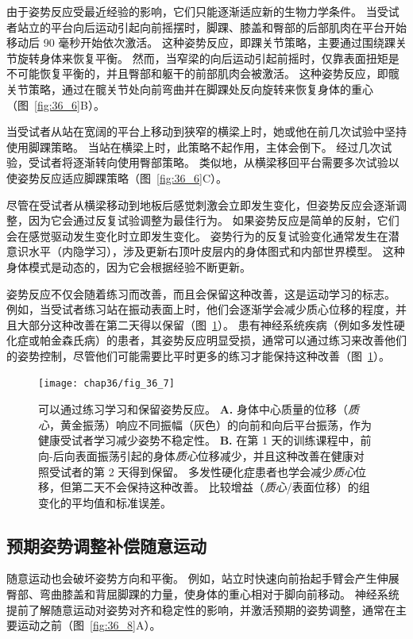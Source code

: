 由于姿势反应受最近经验的影响，它们只能逐渐适应新的生物力学条件。
当受试者站立的平台向后运动引起向前摇摆时，脚踝、膝盖和臀部的后部肌肉在平台开始移动后 90 毫秒开始依次激活。
这种姿势反应，即踝关节策略，主要通过围绕踝关节旋转身体来恢复平衡。
然而，当窄梁的向后运动引起前摇时，仅靠表面扭矩是不可能恢复平衡的，并且臀部和躯干的前部肌肉会被激活。
这种姿势反应，即髋关节策略，通过在髋关节处向前弯曲并在脚踝处反向旋转来恢复身体的重心（图~\ref{fig:36_6}B）。


当受试者从站在宽阔的平台上移动到狭窄的横梁上时，她或他在前几次试验中坚持使用脚踝策略。
当站在横梁上时，此策略不起作用，主体会倒下。
经过几次试验，受试者将逐渐转向使用臀部策略。
类似地，从横梁移回平台需要多次试验以使姿势反应适应脚踝策略（图~\ref{fig:36_6}C）。


尽管在受试者从横梁移动到地板后感觉刺激会立即发生变化，但姿势反应会逐渐调整，因为它会通过反复试验调整为最佳行为。
如果姿势反应是简单的反射，它们会在感觉驱动发生变化时立即发生变化。
姿势行为的反复试验变化通常发生在潜意识水平（内隐学习），涉及更新右顶叶皮层内的身体图式和内部世界模型。
这种身体模式是动态的，因为它会根据经验不断更新。


姿势反应不仅会随着练习而改善，而且会保留这种改善，这是运动学习的标志。
例如，当受试者练习站在振动表面上时，他们会逐渐学会减少质心位移的程度，并且大部分这种改善在第二天得以保留（图~\ref{fig:36_7}）。
患有神经系统疾病（例如多发性硬化症或帕金森氏病）的患者，其姿势反应明显受损，通常可以通过练习来改善他们的姿势控制，尽管他们可能需要比平时更多的练习才能保持这种改善（图~\ref{fig:36_7}）。


\begin{figure}[htbp]
	\centering
	\texttt{[image: chap36/fig\_36\_7]}
	\caption{可以通过练习学习和保留姿势反应。
		\textbf{A.} 身体中心质量的位移（\textit{质心}，黄金振荡）响应不同振幅（灰色）的向前和向后平台振荡，作为健康受试者学习减少姿势不稳定性。
		\textbf{B.} 在第 1 天的训练课程中，前向-后向表面振荡引起的身体\textit{质心}位移减少，并且这种改善在健康对照受试者的第 2 天得到保留。
		多发性硬化症患者也学会减少\textit{质心}位移，但第二天不会保持这种改善。
		比较增益（\textit{质心}/表面位移）的组变化的平均值和标准误差\cite{gera2016postural}。}
	\label{fig:36_7}
\end{figure}



\subsection{预期姿势调整补偿随意运动}

随意运动也会破坏姿势方向和平衡。
例如，站立时快速向前抬起手臂会产生伸展臀部、弯曲膝盖和背屈脚踝的力量，使身体的重心相对于脚向前移动。
神经系统提前了解随意运动对姿势对齐和稳定性的影响，并激活预期的姿势调整，通常在主要运动之前（图~\ref{fig:36_8}A）。


